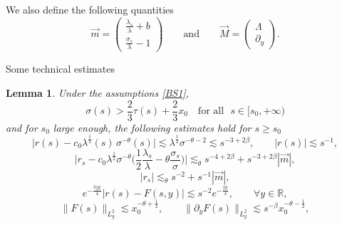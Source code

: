 \documentclass[16pt,english, oneside,reqno]{smfart}
\newcommand{\RR}{\mathbb{R}}
\newtheorem{lemma}[theorem]{Lemma}
\begin{document}
We also define the following quantities
\begin{equation}
    \vec{m}= \begin{pmatrix}

        \frac{\lambda_s}{\lambda}+b\\
        \frac{\sigma_s}{\lambda}-1
    \end{pmatrix} \qquad \text{and} \qquad \vec{M}= \begin{pmatrix}
        \Lambda\\
        \partial_y
    \end{pmatrix}.
\end{equation}

Some technical estimates
\begin{lemma}\label{lemma_with_all_estimates_on_r_F_etc}
    Under the assumptions \eqref{BS1},
    \begin{equation}\label{assumption_on_sigma_on_t}
    \sigma(s)> \frac{2}{3}\tau(s)+\frac{2}{3}x_0 \quad \text{for all } \,\, s\in [s_0,+\infty)
    \end{equation}
    and for $s_0$ large enough, the following estimates hold for $s \geq s_0 $
    \begin{equation}\label{estimates_on_r}
        \big\lvert r(s) - c_0 \lambda^{\frac{1}{2}}(s) \,\sigma^{-\theta}(s) \big\rvert \lesssim \lambda^{\frac{1}{2}}\sigma^{-\theta-2}\lesssim s^{-3+2\beta},\qquad  |r(s)|\lesssim s^{-1},
    \end{equation}
    \begin{equation}\label{estimate_on_r_s}
         \Big\lvert r_s - c_0\lambda^{\frac{1}{2}}\sigma^{-\theta}\Big(\frac{1}{2}\frac{\lambda_s}{\lambda}- \theta \frac{\sigma_s}{\sigma} \Big)\Big\rvert \lesssim_{\theta} s^{-4+2\beta} + s^{-3+2\beta}|\vec{m}|,
    \end{equation}
    \begin{equation}
        |r_s| \lesssim_{\theta} s^{-2} + s^{-1}|\vec{m}|,
    \end{equation}
    \begin{equation}\label{estimate_on_r_minus_F}
        e^{-\frac{3|y|}{4}}\big\lvert r(s)-F(s,y) \big\rvert \lesssim s^{-2}e^{-\frac{|y|}{4}}, \qquad \forall y \in \RR,
    \end{equation}
    \begin{equation}\label{estimates_on_norms_L2_of_F}
        \|F(s)\|_{L^2_y} \lesssim x^{-\theta + \frac{1}{2}}_0,
        \qquad \|\partial_y F(s) \|_{L^2_y} \lesssim s^{-\beta} x^{-\theta - \frac{1}{2}}_0,

\end{equation}
\end{lemma}
\end{document}
